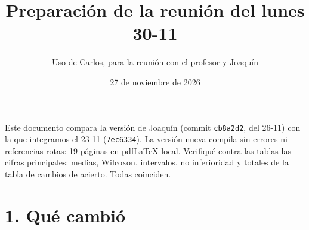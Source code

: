 \documentclass[11pt,a4paper]{article}
\title{\textbf{Preparación de la reunión del lunes 30-11}}
\author{Uso de Carlos, para la reunión con el profesor y Joaquín}
\date{27 de noviembre de 2026}
\begin{document}
\sloppy
\maketitle

Este documento compara la versión de Joaquín (commit \texttt{cb8a2d2}, del 26-11) con la que integramos el 23-11 (\texttt{7ec6334}). La versión nueva compila sin errores ni referencias rotas: 19 páginas en pdfLaTeX local. Verifiqué contra las tablas las cifras principales: medias, Wilcoxon, intervalos, no inferioridad y totales de la tabla de cambios de acierto. Todas coinciden.

\section{1. Qué cambió}
\end{document}
